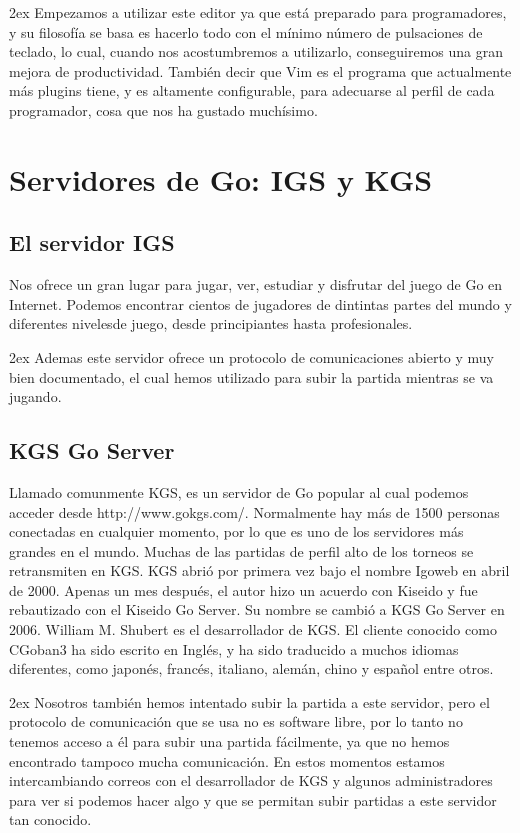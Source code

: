 \documentclass[12pt,a4paper]{report}
\begin{document}
\parskip 2ex 
Empezamos a utilizar este editor ya que está preparado para
programadores, y su filosofía se basa es hacerlo todo con el mínimo número de
pulsaciones de teclado, lo cual, cuando nos acostumbremos a utilizarlo,
conseguiremos una gran mejora de productividad. También decir que Vim es el
programa que actualmente más plugins tiene, y es altamente configurable, para
adecuarse al perfil de cada programador, cosa que nos ha gustado muchísimo. 


\section{Servidores de Go: IGS y KGS} %

\subsection{El servidor IGS}

Nos ofrece un gran lugar para jugar, ver, estudiar y disfrutar del juego de Go
en Internet. Podemos encontrar cientos de jugadores de dintintas partes del
mundo y diferentes nivelesde juego, desde principiantes hasta profesionales. 

\parskip 2ex
Ademas este servidor ofrece un protocolo de comunicaciones abierto y muy bien
documentado, el cual hemos utilizado para subir la partida mientras se va
jugando. 

\subsection{KGS Go Server}

Llamado comunmente KGS, es un servidor de Go popular al cual podemos acceder
desde http://www.gokgs.com/. Normalmente hay más de 1500 personas conectadas en
cualquier momento, por lo que es uno de los servidores más grandes en el mundo.
Muchas de las partidas de perfil alto de los torneos se retransmiten en KGS. KGS
abrió por primera vez bajo el nombre Igoweb en abril de 2000.  Apenas un mes
después, el autor hizo un acuerdo con Kiseido y fue rebautizado con el Kiseido
Go Server. Su nombre se cambió a KGS Go Server en 2006. William M. Shubert es el
desarrollador de KGS. El cliente conocido como CGoban3 ha sido escrito en
Inglés, y ha sido traducido a muchos idiomas diferentes, como japonés, francés,
italiano, alemán, chino y español entre otros. 

\parskip 2ex
Nosotros también hemos intentado subir la partida a este servidor, pero el
protocolo de comunicación que se usa no es software libre, por lo tanto no
tenemos acceso a él para subir una partida fácilmente, ya que no hemos
encontrado tampoco mucha comunicación. En estos momentos estamos intercambiando
correos con el desarrollador de KGS y algunos administradores para ver si
podemos hacer algo y que se permitan subir partidas a este servidor tan
conocido. 
\end{document}
